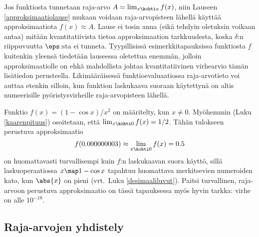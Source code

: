 Jos funktiosta tunnetaan raja-arvo $A = \lim_{x\kohti a} f(x)$, niin Lauseen 
\ref{approksimaatiolause} mukaan voidaan raja-arvopisteen lähellä käyttää approksimaatiota 
$f(x) \approx A$. Lause ei tosin anna (eikä tehdyin oletuksin voikaan antaa) mitään 
kvantitatiivista tietoa approksimaation tarkkuudesta, koska $\delta$:n riippuvuutta
$\eps$:sta ei tunneta. Tyypillisissä esimerkkitapauksissa funktiosta $f$ kuitenkin yleensä
tiedetään lauseessa oletettua enemmän, jolloin approksimaatiolle on ehkä mahdollista johtaa 
kvantitatiivinen virhearvio tämän lisätiedon perusteella. Likimääräisessä funktioevaluaatiossa
raja-arvotieto voi auttaa etenkin silloin, kun funktion laskukaava suoraan käytettynä on
altis numeerisille pyöristysvirheille raja-arvopisteen lähellä.
\begin{Exa} \label{raja-arvolla approksimointi} Funktio $f(x) = (1-\cos x)/x^2$ on määritelty,
kun $x \neq 0$. Myöhemmin (Luku \ref{kaarenpituus}) osoitetaan, että 
$\lim_{x \kohti 0} f(x) = 1/2$. Tähän tulokseen perustuva approksimaatio
\[
f(0.000000003) \approx \lim_{x \kohti 0} f(x) = 0.5
\]
on huomattavasti turvallisempi kuin $f$:n laskukaavan suora käyttö, sillä lasku\-operaatiossa
$x \map 1-\cos x$ tapahtuu huomattava merkitsevien numeroiden kato, kun $\abs{x}$ on pieni 
(vrt.\ Luku \ref{desimaaliluvut}). Paitsi turvallinen, raja-arvoon perustuva
\mbox{approksimaatio} on tässä tapauksessa myös hyvin tarkka: virhe on alle $10^{-18}$. \loppu
\end{Exa}

\subsection*{Raja-arvojen yhdistely}

